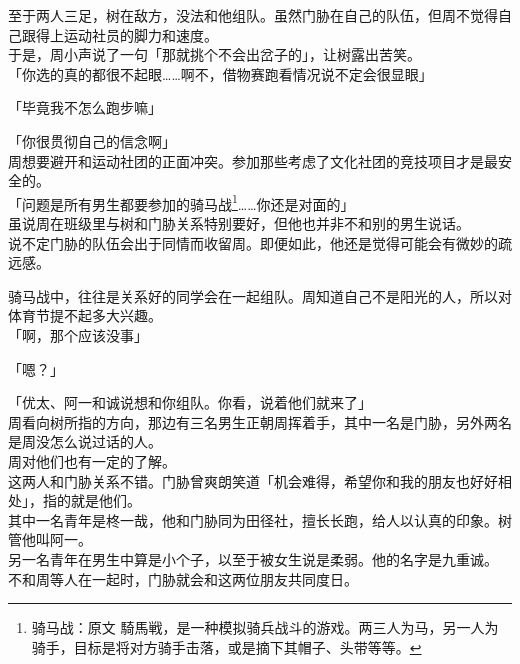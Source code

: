 至于两人三足，树在敌方，没法和他组队。虽然门胁在自己的队伍，但周不觉得自己跟得上运动社员的脚力和速度。\\

于是，周小声说了一句「那就挑个不会出岔子的」，让树露出苦笑。\\

「你选的真的都很不起眼……啊不，借物赛跑看情况说不定会很显眼」

「毕竟我不怎么跑步嘛」

「你很贯彻自己的信念啊」\\

周想要避开和运动社团的正面冲突。参加那些考虑了文化社团的竞技项目才是最安全的。\\

「问题是所有男生都要参加的骑马战\footnote{骑马战：原文 {\jpfont 騎馬戦}，是一种模拟骑兵战斗的游戏。两三人为马，另一人为骑手，目标是将对方骑手击落，或是摘下其帽子、头带等等。}……你还是对面的」\\

虽说周在班级里与树和门胁关系特别要好，但他也并非不和别的男生说话。\\

说不定门胁的队伍会出于同情而收留周。即便如此，他还是觉得可能会有微妙的疏远感。

骑马战中，往往是关系好的同学会在一起组队。周知道自己不是阳光的人，所以对体育节提不起多大兴趣。\\

「啊，那个应该没事」

「嗯？」

「优太、阿一和诚说想和你组队。你看，说着他们就来了」\\

周看向树所指的方向，那边有三名男生正朝周挥着手，其中一名是门胁，另外两名是周没怎么说过话的人。\\

周对他们也有一定的了解。\\

这两人和门胁关系不错。门胁曾爽朗笑道「机会难得，希望你和我的朋友也好好相处」，指的就是他们。\\

其中一名青年是柊一哉，他和门胁同为田径社，擅长长跑，给人以认真的印象。树管他叫阿一。\\

另一名青年在男生中算是小个子，以至于被女生说是柔弱。他的名字是九重诚。\\

不和周等人在一起时，门胁就会和这两位朋友共同度日。\\


